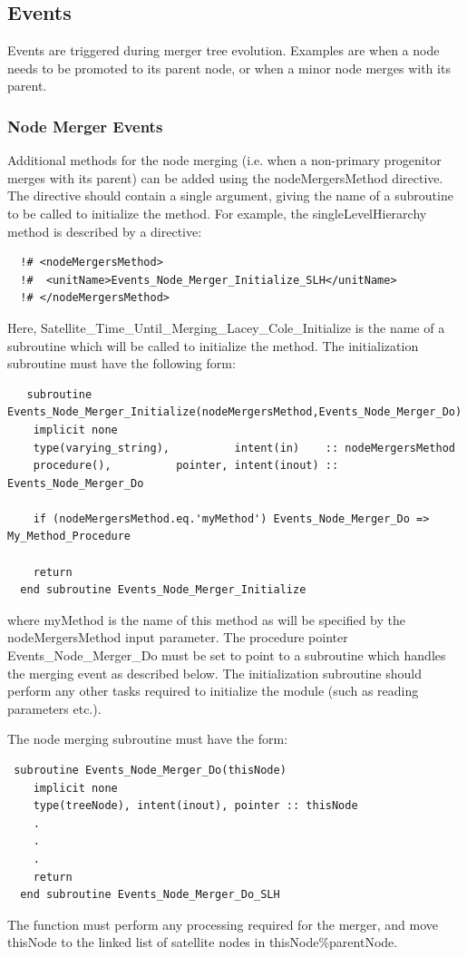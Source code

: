 \subsection{Events}

Events are triggered during merger tree evolution. Examples are when a node needs to be promoted to its parent node, or when a minor node merges with its parent.

\subsubsection{Node Merger Events}

Additional methods for the node merging (i.e. when a non-primary progenitor merges with its parent) can be added using the {\normalfont \ttfamily nodeMergersMethod} directive. The directive should contain a single argument, giving the name of a subroutine to be called to initialize the method. For example, the {\normalfont \ttfamily singleLevelHierarchy} method is described by a directive:
\begin{verbatim}
  !# <nodeMergersMethod>
  !#  <unitName>Events_Node_Merger_Initialize_SLH</unitName>
  !# </nodeMergersMethod>
\end{verbatim}
Here, {\normalfont \ttfamily Satellite\_Time\_Until\_Merging\_Lacey\_Cole\_Initialize} is the name of a subroutine which will be called to initialize the method. The initialization subroutine must have the following form:
\begin{verbatim}
   subroutine Events_Node_Merger_Initialize(nodeMergersMethod,Events_Node_Merger_Do)
    implicit none
    type(varying_string),          intent(in)    :: nodeMergersMethod
    procedure(),          pointer, intent(inout) :: Events_Node_Merger_Do

    if (nodeMergersMethod.eq.'myMethod') Events_Node_Merger_Do => My_Method_Procedure

    return
  end subroutine Events_Node_Merger_Initialize
\end{verbatim}
where {\normalfont \ttfamily myMethod} is the name of this method as will be specified by the {\normalfont \ttfamily nodeMergersMethod} input parameter. The procedure pointer {\normalfont \ttfamily Events\_Node\_Merger\_Do} must be set to point to a subroutine which handles the merging event as described below. The initialization subroutine should perform any other tasks required to initialize the module (such as reading parameters etc.).

The node merging subroutine must have the form:
\begin{verbatim}
 subroutine Events_Node_Merger_Do(thisNode)
    implicit none
    type(treeNode), intent(inout), pointer :: thisNode
    .
    .
    .
    return
  end subroutine Events_Node_Merger_Do_SLH
\end{verbatim}
The function must perform any processing required for the merger, and move {\normalfont \ttfamily thisNode} to the linked list of satellite nodes in {\normalfont \ttfamily thisNode\%parentNode}.


